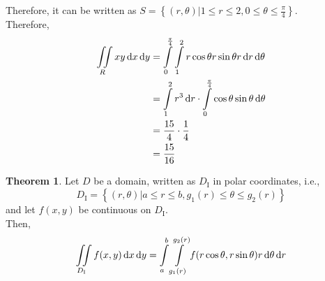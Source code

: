 \documentclass[fleqn, a4paper, 12pt, twoside]{article}
\theoremstyle{definition}
\theoremstyle{theorem}
\newtheorem{theorem}{Theorem}
\begin{document}
{\begin{solution}
\begin{figure}[H]
	\end{figure}
	Therefore, it can be written as $S = \left\{ (r,\theta) | 1 \le r \le 2 , 0 \le \theta \le \frac{\pi}{4} \right\}$.\\
	Therefore,
	\begin{align*}
		\iint\limits_{R} x y \dif x \dif y & = \int\limits_{0}^{\frac{\pi}{4}} \int\limits_{1}^{2} r \cos \theta r \sin \theta r \dif r \dif \theta     \\
                                                   & = \int\limits_{1}^{2} r^3 \dif r \cdot \int\limits_{0}^{\frac{\pi}{4}} \cos \theta \sin \theta \dif \theta \\
                                                   & = \frac{15}{4} \cdot \frac{1}{4}                                                                           \\
                                                   & = \frac{15}{16}
	\end{align*}
\end{solution}

\begin{theorem}
	Let $D$ be a domain, written as $D_{\mathrm{I}}$ in polar coordinates, i.e.,
	\begin{equation*}
		D_{\mathrm{I}} = \left\{ (r,\theta) | a \le r \le b , g_1(r) \le \theta \le g_2(r) \right\}
	\end{equation*}
	and let $f(x,y)$ be continuous on $D_{\mathrm{I}}$.\\
	Then,
	\begin{equation*}
		\iint\limits_{D_{\mathrm{I}}} f(x,y) \dif x \dif y = \int\limits_{a}^{b} \int\limits_{g_1(r)}^{g_2(r)} f(r \cos \theta, r \sin \theta) r \dif \theta \dif r
	\end{equation*}
\end{theorem}

}
\end{document}
